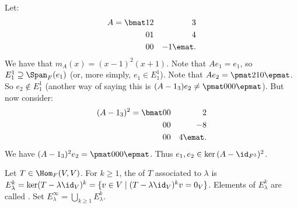     \begin{example}\label{example:gen-eigen-vec}
        Let:
            \begin{equation*}
            \begin{split}
                A = \bmat 1 & 2 & 3 \\ 0 & 1 & 4 \\ 0 & 0 & -1 \emat.
            \end{split}
            \end{equation*}
        We have that $m_A(x) = (x-1)^2(x+1)$. Note that $Ae_1 = e_1$, so $E_1^1 \supseteq \Span_F{(e_1)}$ (or, more simply, $e_1 \in E_1^1$). Note that $Ae_2 = \pmat 2 \\ 1 \\ 0 \epmat$. So $e_2 \not\in E_1^1$ (another way of saying this is $(A-1_3)e_2 \neq \pmat 0 \\ 0 \\ 0 \epmat$). But now consider:
            \begin{equation*}
            \begin{split}
                 (A - 1_3)^2 = \bmat 0 & 0 & 2 \\ 0 & 0 & -8 \\ 0 & 0 & 4 \emat.
            \end{split}
            \end{equation*}
        We have $(A-1_3)^2 e_2 = \pmat 0 \\ 0\\ 0 \epmat$. Thus $e_1,e_2 \in \ker{(A-\id_{F^3})^2}$.
    \end{example}

    \begin{definition}
        Let $T \in \Hom_F{(V,V)}$. For $k \geq 1$, the  of $T$ associated to $\lambda$ is $E_\lambda^k = \ker(T - \lambda \id_V)^k = \{v \in V \mid (T-\lambda \id_V)^k v = 0_V \}$. Elements of $E_\lambda^k$ are called . Set $E_\lambda^\infty = \bigcup_{k \geq 1} E_\lambda^k$.
    \end{definition}

